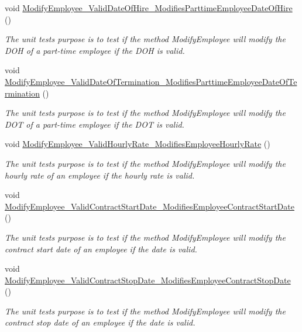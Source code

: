 \begin{DoxyCompactItemize}
void \hyperlink{class_the_company_1_1_tests_1_1_modify_employee_tests_ab6482b47c74d2fb958459bae78d67944}{Modify\+Employee\+\_\+\+Valid\+Date\+Of\+Hire\+\_\+\+Modifies\+Parttime\+Employee\+Date\+Of\+Hire} ()
\begin{DoxyCompactList}\small\item\em The unit test\textquotesingle{}s purpose is to test if the method Modify\+Employee will modify the D\+O\+H of a part-\/time employee if the D\+O\+H is valid. \end{DoxyCompactList}\item 
void \hyperlink{class_the_company_1_1_tests_1_1_modify_employee_tests_a76f03f24e7c9973acb0f65e8689d3027}{Modify\+Employee\+\_\+\+Valid\+Date\+Of\+Termination\+\_\+\+Modifies\+Parttime\+Employee\+Date\+Of\+Termination} ()
\begin{DoxyCompactList}\small\item\em The unit test\textquotesingle{}s purpose is to test if the method Modify\+Employee will modify the D\+O\+T of a part-\/time employee if the D\+O\+T is valid. \end{DoxyCompactList}\item 
void \hyperlink{class_the_company_1_1_tests_1_1_modify_employee_tests_a59b659973b728ae7d7f905c51a04516f}{Modify\+Employee\+\_\+\+Valid\+Hourly\+Rate\+\_\+\+Modifies\+Employee\+Hourly\+Rate} ()
\begin{DoxyCompactList}\small\item\em The unit test\textquotesingle{}s purpose is to test if the method Modify\+Employee will modify the hourly rate of an employee if the hourly rate is valid. \end{DoxyCompactList}\item 
void \hyperlink{class_the_company_1_1_tests_1_1_modify_employee_tests_aefbc5d5b7505972d4fabcbe084fe497e}{Modify\+Employee\+\_\+\+Valid\+Contract\+Start\+Date\+\_\+\+Modifies\+Employee\+Contract\+Start\+Date} ()
\begin{DoxyCompactList}\small\item\em The unit test\textquotesingle{}s purpose is to test if the method Modify\+Employee will modify the contract start date of an employee if the date is valid. \end{DoxyCompactList}\item 
void \hyperlink{class_the_company_1_1_tests_1_1_modify_employee_tests_ad6e8eaf73cd1ed44d4c49f8253033283}{Modify\+Employee\+\_\+\+Valid\+Contract\+Stop\+Date\+\_\+\+Modifies\+Employee\+Contract\+Stop\+Date} ()
\begin{DoxyCompactList}\small\item\em The unit test\textquotesingle{}s purpose is to test if the method Modify\+Employee will modify the contract stop date of an employee if the date is valid. \end{DoxyCompactList}\item 

\end{DoxyCompactItemize}

